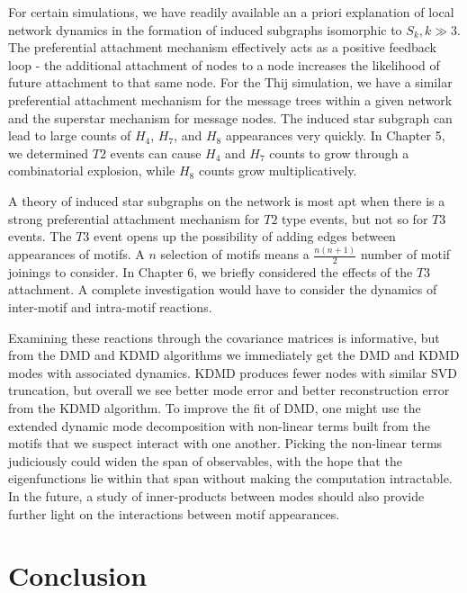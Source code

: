 For certain simulations, we have readily available an a priori explanation
of local network dynamics in the formation of induced subgraphs isomorphic to $S_k, k \gg 3$. The preferential
attachment mechanism effectively acts as a positive feedback loop - the
additional attachment of nodes to a node increases
the likelihood of future attachment to that same node. For the Thij simulation, we have a similar preferential attachment mechanism 
for the message trees within a given network and the superstar mechanism for message nodes.
 The induced star subgraph can lead to large counts of $H_{4}$, $H_{7}$, and $H_{8}$ appearances very
quickly. In Chapter 5, we determined $T2$ events can cause $H_{4}$ and $H_{7}$ counts to grow through a combinatorial explosion, while $H_{8}$
counts grow multiplicatively. 

A theory of induced star subgraphs on the network is most apt when
there is a strong preferential attachment mechanism for $T2$ type events, but not so for $T3$ events. 
The $T3$ event opens up the possibility of adding edges between appearances of 
motifs. A $n$ selection of motifs means a $\frac{n(n+1)}{2}$ number of motif joinings to consider. In Chapter 6,
 we briefly considered the effects of the $T3$ attachment. A complete 
 investigation would have to consider the dynamics of inter-motif and intra-motif reactions. 

 Examining these reactions through the covariance matrices is informative, but from the DMD and KDMD 
 algorithms we immediately get the DMD and KDMD modes with associated dynamics. KDMD produces 
 fewer nodes with similar SVD truncation, but overall we see better mode error and better reconstruction error
 from the KDMD algorithm.  To improve the fit of DMD, one might use the extended dynamic mode 
 decomposition with non-linear terms built from the motifs that we suspect interact with one another.
 Picking the non-linear terms judiciously could widen the span of observables, with the hope
 that the eigenfunctions lie within that span without making the computation intractable. In the future, a study of inner-products between modes
 should also provide further light on the interactions between motif appearances.

\chapter{Conclusion}


